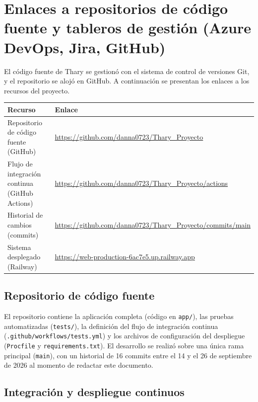 \section{Enlaces a repositorios de código fuente y tableros de gestión (Azure DevOps, Jira, GitHub)}

El código fuente de Thary se gestionó con el sistema de control de versiones Git, y el repositorio se alojó en GitHub. A continuación se presentan los enlaces a los recursos del proyecto.

\begin{table}[H]
\centering
\renewcommand{\arraystretch}{1.3}
\begin{tabularx}{\textwidth}{|l|X|}
\hline
\textbf{Recurso} & \textbf{Enlace} \\
\hline
Repositorio de código fuente (GitHub) & \url{https://github.com/danna0723/Thary_Proyecto} \\
\hline
Flujo de integración continua (GitHub Actions) & \url{https://github.com/danna0723/Thary_Proyecto/actions} \\
\hline
Historial de cambios (commits) & \url{https://github.com/danna0723/Thary_Proyecto/commits/main} \\
\hline
Sistema desplegado (Railway) & \url{https://web-production-6ac7e5.up.railway.app} \\
\hline
\end{tabularx}
\end{table}

\subsection*{Repositorio de código fuente}

El repositorio contiene la aplicación completa (código en \texttt{app/}), las pruebas automatizadas (\texttt{tests/}), la definición del flujo de integración continua (\texttt{.github/workflows/tests.yml}) y los archivos de configuración del despliegue (\texttt{Procfile} y \texttt{requirements.txt}). El desarrollo se realizó sobre una única rama principal (\texttt{main}), con un historial de 16 commits entre el 14 y el 26 de septiembre de 2026 al momento de redactar este documento.

\subsection*{Integración y despliegue continuos}

